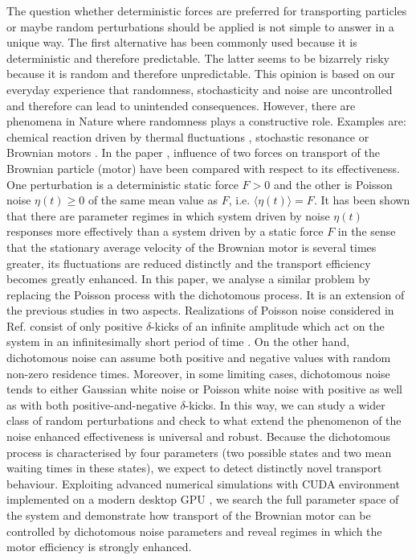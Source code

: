 \documentclass[12pt]{iopart}
\begin{document}
The question whether deterministic forces are preferred for transporting particles or maybe random perturbations should be applied is not simple to answer in a unique way. The first alternative has been commonly used because it is deterministic and therefore predictable. The latter seems to be bizarrely risky because it is random  and therefore unpredictable.  This opinion is based on our everyday experience  that randomness, stochasticity  and noise are  uncontrolled and therefore can lead to unintended consequences. However, there are phenomena in Nature where randomness  plays a constructive role. Examples are: chemical reaction driven by thermal fluctuations \cite{reactions}, stochastic resonance \cite{stochres} or Brownian motors \cite{LucTal2000,ratchets}. In the paper \cite{spiechPRE}, influence of two forces on transport of the Brownian particle (motor) have been compared with respect to its effectiveness. One perturbation is a deterministic static force $F>0$ and the other is Poisson noise $\eta(t) \ge 0$ of the same mean value as $F$, i.e. $\langle \eta(t) \rangle =F$. It has been shown that there are parameter regimes in which system driven by noise $\eta(t)$ responses more effectively than a system driven by a static force $F$ in the sense that the stationary average velocity of the Brownian motor is several times greater, its fluctuations are reduced distinctly and the transport efficiency becomes greatly enhanced. In this paper, we analyse a similar problem by replacing the Poisson process with the dichotomous process. It is an extension of the previous studies in two aspects. Realizations of Poisson noise considered in Ref. \cite{spiechPRE} consist of only positive $\delta$-kicks of an infinite amplitude which act on the system in an infinitesimally short period of time \cite{spiechJSTATMECH, spiechSCRIPTA}. On the other hand, dichotomous noise can assume both positive and negative values with random non-zero residence times. Moreover, in some limiting cases, dichotomous noise tends to either Gaussian white noise or Poisson white noise with positive as well as with both positive-and-negative $\delta$-kicks. In this way, we can study a wider class of random perturbations and check to what extend the phenomenon  of the noise enhanced effectiveness is universal and robust. Because the dichotomous process is characterised by four parameters (two possible states and two mean waiting times in these states), we expect to detect distinctly novel transport behaviour. Exploiting advanced numerical simulations with CUDA environment implemented on a modern desktop GPU \cite{spiechCPC}, we search the full parameter space of the system and demonstrate how transport of the Brownian motor can be controlled by dichotomous noise parameters and reveal regimes in which the motor efficiency is strongly enhanced.
\end{document}
